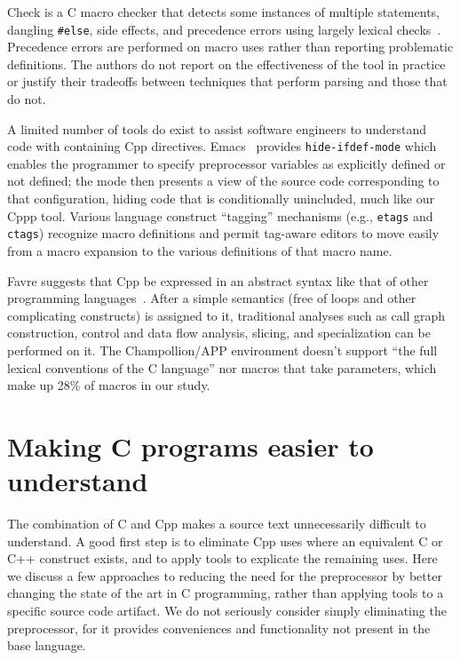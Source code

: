 \documentclass[10pt]{article}
\begin{document}

Check is a C macro checker that detects some instances of multiple
statements, dangling {\tt \#else}, side effects, and precedence errors
using largely lexical checks~\cite{SpulerS92}.  Precedence errors are
performed on macro uses rather than reporting problematic definitions.  The
authors do not report on the effectiveness of the tool in practice or
justify their tradeoffs between techniques that perform parsing and those
that do not.

A limited number of tools do exist to assist software engineers to
understand code with containing Cpp directives.  Emacs~\cite{GNUEmacs19.26}
provides \texttt{hide-ifdef-mode} which enables the programmer to specify
preprocessor variables as explicitly defined or not defined; the mode then
presents a view of the source code corresponding to that configuration,
hiding code that is conditionally unincluded, much like our Cppp tool.
Various language construct ``tagging'' mechanisms (e.g., \texttt{etags} and
\texttt{ctags}) recognize macro definitions and permit tag-aware editors
to move easily from a macro expansion to the various definitions of that
macro name.

Favre suggests that Cpp be expressed in an abstract syntax like that of
other programming languages~\cite{Favre96}.  After a simple semantics (free
of loops and other complicating constructs) is assigned to it, traditional
analyses such as call graph construction, control and data flow analysis,
slicing, and specialization can be performed on it.  The Champollion/APP
environment doesn't support ``the full lexical conventions of the C
language'' nor macros that take parameters, which make up 28\% of macros in
our study.




\section{Making C programs easier to understand}
\label{sec:easier-to-understand}

The combination of C and Cpp makes a source text unnecessarily difficult
to understand.  A good first step is to eliminate Cpp uses where an
equivalent C or C++ construct exists, and to apply tools to explicate
the remaining uses.  Here we discuss a few approaches to reducing the
need for the preprocessor by better changing the state of the art in C
programming, rather than applying tools to a specific source code
artifact.  We do not seriously consider simply eliminating the
preprocessor, for it provides conveniences and functionality not present
in the base language.
\end{document}
